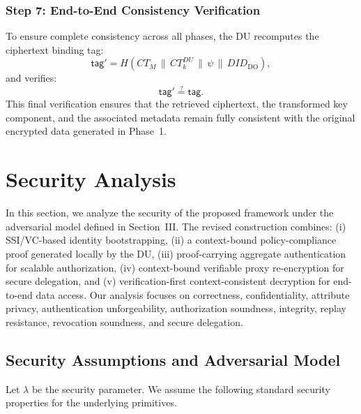 \documentclass[conference]{IEEEtran}
\begin{document}
\subsubsection*{Step 7: End-to-End Consistency Verification}

To ensure complete consistency across all phases, the DU recomputes the ciphertext binding tag:
\[
\mathsf{tag}' = H(CT_M \,\|\, CT_k^{DU} \,\|\, \psi \,\|\, DID_{\text{DO}}),
\]
and verifies:
\[
\mathsf{tag}' \stackrel{?}{=} \mathsf{tag}.
\]
This final verification ensures that the retrieved ciphertext, the transformed key component, and the associated metadata remain fully consistent with the original encrypted data generated in Phase~1.





\section{Security Analysis}
\label{sec:security}

In this section, we analyze the security of the proposed framework under the adversarial model defined in Section~III. The revised construction combines: (i) SSI/VC-based identity bootstrapping, (ii) a context-bound policy-compliance proof generated locally by the DU, (iii) proof-carrying aggregate authentication for scalable authorization, (iv) context-bound verifiable proxy re-encryption for secure delegation, and (v) verification-first context-consistent decryption for end-to-end data access. Our analysis focuses on correctness, confidentiality, attribute privacy, authentication unforgeability, authorization soundness, integrity, replay resistance, revocation soundness, and secure delegation.

\subsection{Security Assumptions and Adversarial Model}

Let $\lambda$ be the security parameter. We assume the following standard security properties for the underlying primitives.
\end{document}
